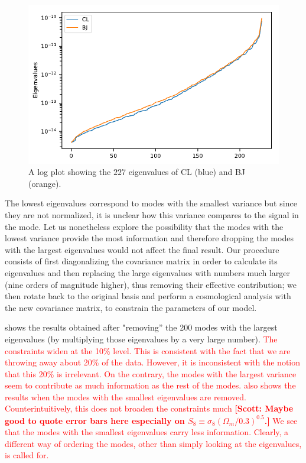 \documentclass[twocolumn]{\docclass}
\newcommand\scott[1]{{\bf [Scott: #1]}}
\begin{document}
	\begin{figure}
		\includegraphics[width=0.9\columnwidth]{Eigenvalues/Eigenvalues_Y3_BJ-CL.pdf}
		\caption{A log plot showing the $227$ eigenvalues of CL (blue) and BJ (orange). \label{fig:coveigen}}
	\end{figure}


	
	The lowest eigenvalues correspond to modes with the smallest variance but since they are not normalized, it is unclear how this variance compares to the signal in the mode. Let us nonetheless explore the possibility that the modes with the lowest variance provide the most information and therefore dropping the modes with the largest eigenvalues would not affect the final result.
Our procedure consists of first diagonalizing the covariance matrix in order to calculate its eigenvalues and then replacing the large eigenvalues with numbers much larger (nine orders of magnitude higher), thus removing their effective contribution; we then rotate back to the original basis and perform a cosmological analysis with the new covariance matrix, to constrain the parameters of our model. 

 shows the results obtained after "removing'' the 200 modes with the largest eigenvalues (by multiplying those eigenvalues by a very large number). 
\textcolor{red}{
The constraints widen at the 10\% level. This is consistent with the fact that we are throwing away about 20\% of the data. However, it is inconsistent with the notion that this 20\% is irrelevant. On the contrary, the modes with the largest variance seem to contribute as much information as the rest of the modes.   also shows the results when the modes with the smallest eigenvalues are removed. Counterintuitively, this does not broaden the constraints much \scott{Maybe good to quote error bars here especially on $S_8\equiv \sigma_8 (\Omega_m/0.3)^{0.5}$.} We see that the modes with the smallest eigenvalues carry less information. Clearly, a different way of ordering the modes, other than simply looking at the eigenvalues, is called for.}
\end{document}
